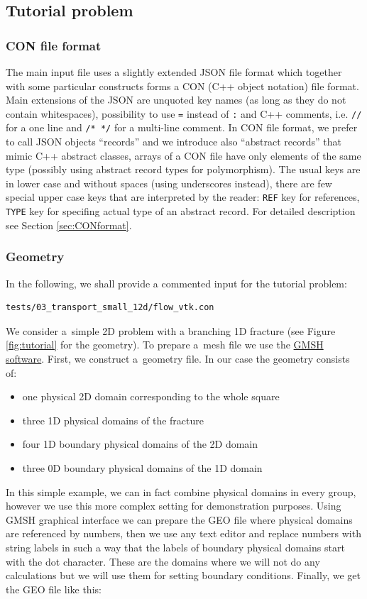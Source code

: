 \documentclass[12pt,a4paper]{report}
\begin{document}
\subsection{Tutorial problem}
\subsubsection{CON file format}
The main input file uses a slightly extended JSON file format which together with some particular constructs forms a CON (C++ object notation) file format. 
Main extensions of the JSON are unquoted key names (as long as they do not contain whitespaces), possibility to use \verb'=' instead of \verb':' 
and C++ comments, i.e. \verb'//' for a one line and \verb'/* */' for a multi-line comment. In CON file format, we prefer to call JSON objects ``records'' and we introduce also ``abstract records''
that mimic C++ abstract classes, arrays of a CON file have only elements of the same type (possibly using abstract record types for polymorphism). 
The usual keys are in lower case and without spaces (using underscores instead),
there are few special upper case keys that are interpreted by the reader: \verb'REF' key for references, \verb'TYPE' key for specifing actual type of an abstract record.
For detailed description see Section \ref{sec:CONformat}.

\subsubsection{Geometry}
In the following, we shall provide a commented input for the tutorial problem:
\begin{verbatim}
tests/03_transport_small_12d/flow_vtk.con
\end{verbatim}

We consider a~simple 2D problem with a branching 1D fracture (see Figure \ref{fig:tutorial} for the geometry). To prepare a~mesh file we use the \href{http://geuz.org/gmsh/}{GMSH software}.
First, we construct a~geometry file. In our case the geometry consists of: 
\begin{itemize}
 \item one physical 2D domain corresponding to the whole square
 \item three 1D physical domains of the fracture
 \item four 1D boundary physical domains of the 2D domain
 \item three 0D boundary physical domains of the 1D domain
\end{itemize}
In this simple example, we can in fact combine physical domains in every group, however we use this more complex setting for
demonstration purposes. Using GMSH graphical interface we can prepare the GEO file where physical domains are referenced by numbers, then we use 
any text editor and replace numbers with string labels in such a way that the labels of boundary physical domains start with the dot character. 
These are the domains where we will not do any calculations but we will use them for setting boundary conditions.
Finally, we get the GEO file like this:
\end{document}
